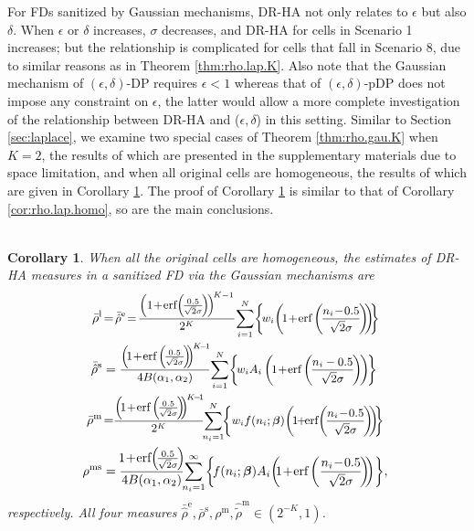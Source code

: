 \documentclass[10pt,journal,compsoc]{IEEEtran}
\newtheorem{cor}[thm]{\vspace{-6pt}\\ Corollary}
\newcommand{\bs}{\boldsymbol}
\begin{document}
For FDs  sanitized by Gaussian mechanisms, DR-HA  not only relates to $\epsilon$ but also  $\delta$. When $\epsilon$ or $\delta$ increases, $\sigma$ decreases, and DR-HA for cells in Scenario 1 increases; but the relationship is complicated for cells that fall in Scenario 8, due to similar reasons as in Theorem \ref{thm:rho.lap.K}. Also note that the Gaussian mechanism of $(\epsilon,\delta)$-DP requires $\epsilon<1$ whereas that of $(\epsilon,\delta)$-pDP does not impose any constraint on $\epsilon$, the latter would allow a more complete investigation of the relationship between DR-HA and ($\epsilon,\delta$) in this setting. 
Similar to Section \ref{sec:laplace}, we examine two special cases of Theorem \ref{thm:rho.gau.K} when $K=2$, the results of which are presented in the supplementary materials due to  space limitation, and when all original cells are homogeneous, the results of which are given in Corollary \ref{cor:rho.Gau.homo}. The proof of Corollary \ref {cor:rho.Gau.homo} is similar to that of  Corollary \ref{cor:rho.lap.homo}, so are the main conclusions.
\begin{cor}\label{cor:rho.Gau.homo}
When  all the original cells are homogeneous, the estimates of DR-HA measures in a sanitized FD via the Gaussian mechanisms  are
\begin{align}
\bar{\rho}^{\text{l}}&\!=\!\mbox{\small$\displaystyle\bar{\hat{\rho}}^{\text{e}}\!=\!
\frac{\left(1\!+\!\mbox{erf}\!\left(\!\frac{0.5}{\sqrt{2}\sigma}\!\right)\!\right)^{\!K-1}}{2^K}\!\sum_{i=1}^N\!\bigg\{\!w_i\!\left(\!1\!+\!\mbox{erf}\left(\!\frac{n_i\!-\!0.5}{\sqrt{2}\sigma}\!\right)\!\!\right)\!\!\!\bigg\}\!\!$}\label{eqn:averagel.Gau.homo}\\
\!\!\!\!\bar{\hat{\rho}}^{\text{s}}&=\mbox{\small$\displaystyle \frac{\left(\!1\!+\!\mbox{erf}\left(\!\frac{0.5}{\sqrt{2}\sigma}\!\right)\!\!\right)^{\!K\!-\!1\!}}{4 B(\alpha_1,\alpha_2)}\!\sum_{i=1}^N\!\bigg\{\!w_iA_i\left(\!1\!+\!\mbox{erf}\left(\!\frac{n_i-0.5}{\sqrt{2}\sigma}\!\right)\!\right)\!\!\bigg\}$}\label{eqn:averages.Gau.homo}\\
\!\!\!\!\bar{\rho}^{\text{m}}&\!=\!\mbox{\small$\displaystyle \!\frac{\left(\!1\!+\!\mbox{erf}\left(\!\frac{0.5}{\sqrt{2}\sigma}\!\right)\!\!\right)^{\!K\!-\!1\!}}{2^K}\!\!\sum_{n_i=1}^N\!\!\bigg\{w_if(n_i;\bs\beta)\!\left(\!1\!\!+\!\!\mbox{erf}\!\left(\!\frac{n_i\!-\!0.5}{\sqrt{2}\sigma}\!\right)\!\!\right)\!\!\!\bigg\}$}\!\!\!
\label{eqn:tilde.rho.Gau}\\
\!\!\!\!\rho^{\text{ms}}&=\frac{\!1\!+\!\mbox{erf}\!\left(\!\frac{0.5}{\sqrt{2}\sigma}\!\right)\!}{4B(\alpha_1,\alpha_2)}\!\!\sum_{n_i=1}^{\infty}\!\bigg\{\!f(n_i;\bs\beta)A_i\!\left(\!\!1\!+\!\mbox{erf}\left(\frac{n_i\!-\!0.5}{\sqrt{2}\sigma}\!\right)\!\!\right)\!\bigg\},\!\!\label{eqn:averagem.Gau.homo}
\end{align}
respectively. All four measures $\bar{\hat{\rho}}^{\text{e}},\bar{\rho}^{\text{s}}, \rho^{\text{m}},\hat{\tilde\rho}^{\text{m}}\in(2^{-K},1)$.
\end{cor}
\end{document}

